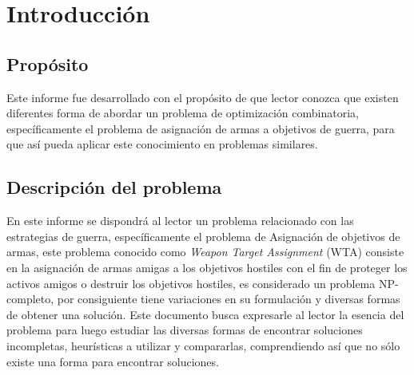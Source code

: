 \section{Introducci\'on}

\subsection{Propósito}
Este informe fue desarrollado con el propósito de que lector conozca que existen diferentes forma de abordar un problema de optimización combinatoria, específicamente el problema de asignación de armas a objetivos de guerra, para que así pueda aplicar este conocimiento en problemas similares.

\subsection{Descripción del problema}



En este informe se dispondrá al lector un problema relacionado con las estrategias de guerra, específicamente el problema de Asignación de objetivos de armas, este problema conocido como \textit{Weapon Target Assignment} (WTA) consiste en la asignación de armas amigas a los objetivos hostiles con el fin de proteger los activos amigos o destruir los objetivos hostiles, es considerado un problema NP-completo, por consiguiente tiene variaciones en su formulación y diversas formas de obtener una solución.
Este documento busca expresarle al lector la esencia del problema para luego estudiar las diversas formas de encontrar soluciones incompletas, heurísticas a utilizar y compararlas, comprendiendo así que no sólo existe una forma para encontrar soluciones.

